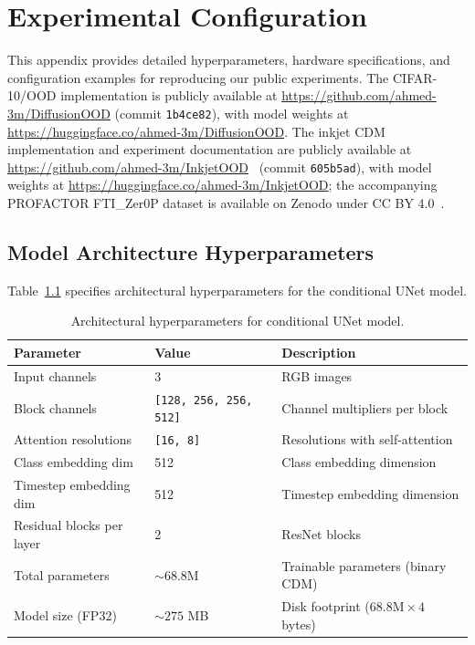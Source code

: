 \chapter{Experimental Configuration}
\label{app:experimental-config}

This appendix provides detailed hyperparameters, hardware specifications, and configuration examples for reproducing our public experiments. The CIFAR-10/OOD implementation is publicly available at \url{https://github.com/ahmed-3m/DiffusionOOD} (commit \texttt{1b4ce82}), with model weights at \url{https://huggingface.co/ahmed-3m/DiffusionOOD}. The inkjet CDM implementation and experiment documentation are publicly available at \url{https://github.com/ahmed-3m/InkjetOOD}~\cite{mohammed2026inkjetood} (commit \texttt{605b5ad}), with model weights at \url{https://huggingface.co/ahmed-3m/InkjetOOD}; the accompanying PROFACTOR FTI\_Zer0P dataset is available on Zenodo under CC BY 4.0~\citep{profactor2024fti}.

\section{Model Architecture Hyperparameters}
\label{app:experimental-config:hyperparameters}

Table~\ref{tab:appC:architecture} specifies architectural hyperparameters for the conditional UNet model.

\begin{table}[htbp]
  \centering
  \caption{Architectural hyperparameters for conditional UNet model.}
  \label{tab:appC:architecture}
  \footnotesize
  \begin{tabular}{@{}llp{7.5cm}@{}}
    \toprule
    Parameter & Value & Description \\
    \midrule
    Input channels & 3 & RGB images \\
    Block channels & \texttt{[128, 256, 256, 512]} & Channel multipliers per block \\
    Attention resolutions & \texttt{[16, 8]} & Resolutions with self-attention \\
    Class embedding dim & 512 & Class embedding dimension \\
    Timestep embedding dim & 512 & Timestep embedding dimension \\
    Residual blocks per layer & 2 & ResNet blocks \\
    Total parameters & ${\sim}68.8\text{M}$ & Trainable parameters (binary CDM) \\
    Model size (FP32) & ${\sim}275$ MB & Disk footprint ($68.8\text{M} \times 4$ bytes) \\
    \bottomrule
  \end{tabular}
\end{table}

